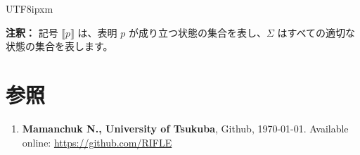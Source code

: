 \documentclass[12pt,a4paper]{article}
\begin{document}
\begin{CJK}{UTF8}{ipxm}
\bigskip

\textbf{注釈：} 記号 \( \llbracket p \rrbracket \) は、表明 \( p \) が成り立つ状態の集合を表し、\( \Sigma \) はすべての適切な状態の集合を表します。






\section*{参照}
\begin{enumerate}
    \item \textbf{Mamanchuk N., University of Tsukuba}, Github, \today. Available online: \url{https://github.com/RIFLE}
\end{enumerate}


\end{CJK}
\end{document}
